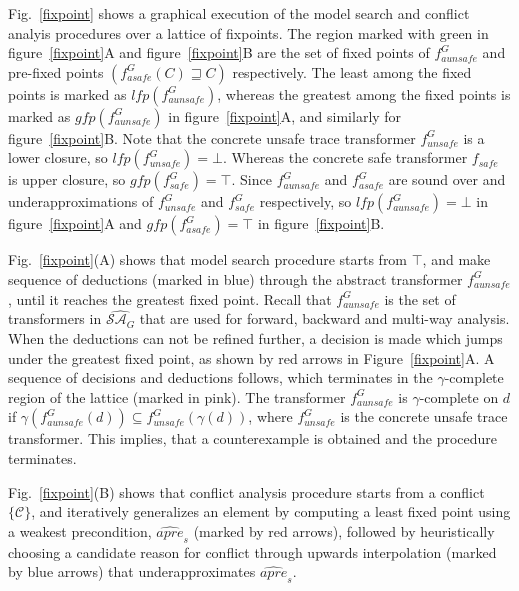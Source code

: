 {{Fig.~\ref{fixpoint} shows a graphical execution of the model search and 
conflict analyis procedures over a lattice of fixpoints.  The region marked 
with green in figure~\ref{fixpoint}A and figure~\ref{fixpoint}B are the set of 
fixed points of $f_{aunsafe}^G$ and pre-fixed points $(f_{asafe}^G(C) \sqsupseteq C)$ 
respectively.   The least among the fixed points is marked as
$lfp(f_{aunsafe}^G)$, whereas the greatest among the fixed points is marked as
$gfp(f_{aunsafe}^G)$ in figure~\ref{fixpoint}A, and similarly for figure~\ref{fixpoint}B.  
Note that the concrete unsafe trace transformer $f_{unsafe}^G$ is a lower closure, 
so $lfp(f_{unsafe}^G) = \bot$.  Whereas the concrete safe transformer $f_{safe}$ is 
upper closure, so $gfp(f_{safe}^G) = \top$.  Since $f_{aunsafe}^G$ and $f_{asafe}^G$ 
are sound over and underapproximations of $f_{unsafe}^G$ and $f_{safe}^G$ respectively, 
so $lfp(f_{aunsafe}^G) = \bot$ in figure~\ref{fixpoint}A and $gfp(f_{asafe}^G) = \top$ in 
figure~\ref{fixpoint}B.

%

Fig.~\ref{fixpoint}(A) shows that model search procedure starts 
from $\top$, and make sequence of deductions (marked in blue) 
through the abstract transformer $f_{aunsafe}^G$, until it reaches 
the greatest fixed point.  Recall that $f_{aunsafe}^G$ is the
set of transformers in $\widehat{\mathcal{SA}_G}$ that are used for forward, 
backward and multi-way analysis. 
When the deductions can not be refined further, a decision is made which 
jumps under the greatest fixed point, as shown by red arrows in 
Figure~\ref{fixpoint}A.   
A sequence of decisions and deductions follows, which
terminates in the $\gamma$-complete region of the lattice (marked in pink). The
transformer $f_{aunsafe}^G$ is $\gamma$-complete on $d$ if $\gamma(f_{aunsafe}^G(d))
\subseteq f_{unsafe}^G(\gamma(d))$, where $f_{unsafe}^G$ is the concrete unsafe trace 
transformer.  This implies, that a counterexample is obtained and the procedure terminates.
%


Fig.~\ref{fixpoint}(B) shows that conflict analysis procedure starts from a
conflict $\{\mathcal{C}\}$, and iteratively generalizes an element by computing a
least fixed point using a weakest precondition, $\widehat{apre}_s$ (marked by
red arrows), followed by heuristically choosing a candidate reason for conflict 
through upwards interpolation (marked by blue arrows) that underapproximates 
$\widehat{apre}_s$.   

}}
